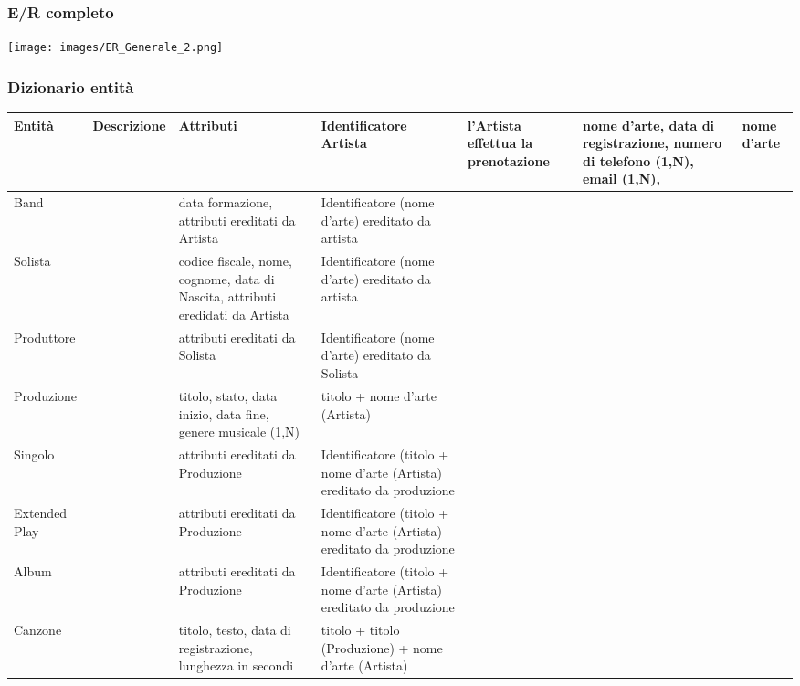 \documentclass{article}
\begin{document}
\subsubsection{E/R completo}
\begin{center}
    \texttt{[image: images/ER\_Generale\_2.png]}
\end{center}

\subsubsection{Dizionario entità}





\renewcommand*{\arraystretch}{1.4}
\begin{longtable}{|p{.15\linewidth}|p{.25\linewidth}|p{.25\linewidth}|p{.15\linewidth}|}
    \hline
    \textbf{Entità} & \textbf{Descrizione} & \textbf{Attributi} & \textbf{Identificatore} 
    \endhead 
    \hline
    Artista & l'Artista effettua la prenotazione & nome d'arte, data di registrazione, numero di telefono (1,N), email (1,N), & nome d'arte  \\ \hline
    Band & & data formazione, attributi ereditati da Artista & Identificatore (nome d'arte) ereditato da artista \\ \hline
    Solista & & codice fiscale, nome, cognome, data di Nascita, attributi eredidati da Artista & Identificatore (nome d'arte) ereditato  da artista \\ \hline
    Produttore & & attributi ereditati da Solista & Identificatore (nome d'arte) ereditato da Solista\\ \hline
    Produzione & & titolo, stato, data inizio, data fine, genere musicale (1,N) & titolo + nome d'arte (Artista) \\ \hline
    Singolo & & attributi ereditati da Produzione & Identificatore (titolo + nome d'arte (Artista) ereditato da produzione \\ \hline
    Extended Play & & attributi ereditati da Produzione & Identificatore (titolo + nome d'arte (Artista) ereditato da produzione \\ \hline
    Album & & attributi ereditati da Produzione & Identificatore (titolo + nome d'arte (Artista) ereditato da produzione \\ \hline
    Canzone & & titolo, testo, data di registrazione, lunghezza in secondi & titolo + titolo (Produzione) + nome d'arte (Artista) \\ \hline

\end{longtable}
\end{document}
